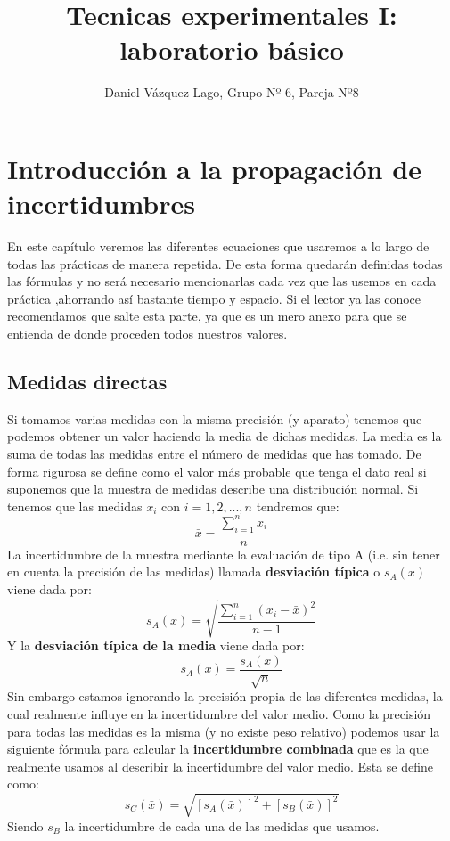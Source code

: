 \documentclass[12pt,a4paper]{book}
\author{Daniel Vázquez Lago, Grupo Nº 6, Pareja Nº8}
\begin{document}
\title{Tecnicas experimentales I: laboratorio básico}
\maketitle
\tableofcontents

\chapter{Introducción a la propagación de incertidumbres}\label{Ch:introduccion-incertidumbres}\newpage
En este capítulo veremos las diferentes ecuaciones que usaremos a lo  largo de todas las prácticas de manera repetida. De esta forma quedarán definidas todas las fórmulas y no será necesario mencionarlas cada vez que las usemos en cada práctica ,ahorrando así bastante tiempo y espacio. Si el lector ya las conoce recomendamos que salte esta parte, ya que es un mero anexo para que se entienda de donde proceden todos nuestros valores. \\

\section{Medidas directas}
Si tomamos varias medidas con la misma precisión (y aparato) tenemos que podemos obtener un valor haciendo la media de dichas medidas. La media es la suma de todas las medidas entre el número de medidas que has tomado. De forma rigurosa se define como el valor más probable que tenga el dato real si suponemos que la muestra de medidas describe una distribución normal. Si tenemos que las medidas $x_i$ con $i=1,2,...,n$ tendremos que:
\begin{equation}
\bar{x}=\dfrac{\sum_{i=1}^n x_i}{n}
\label{Ec: valor medio o media}
\end{equation}
La incertidumbre de la muestra mediante la evaluación de tipo A (i.e. sin tener en cuenta la precisión de las medidas) llamada \textbf{desviación típica} o $s_A (x)$ viene dada por:
\begin{equation}
s_A(x) = \sqrt{\dfrac{\sum_{i=1}^n (x_i - \bar{x})^2}{n-1}}
\label{Ec: desviación estandar de la muestra}
\end{equation}
Y la \textbf{desviación típica de la media} viene dada por:
\begin{equation}
s_A(\bar{x}) = \dfrac{s_A(x)}{\sqrt{n}}
\label{Ec: desviación estandar de la media}
\end{equation}
Sin embargo estamos ignorando la precisión propia de las diferentes medidas, la cual realmente influye en la incertidumbre del valor medio. Como la precisión para todas las medidas es la misma (y no existe peso relativo) podemos usar la siguiente fórmula para calcular la \textbf{incertidumbre combinada} que es la que realmente usamos al describir la incertidumbre del valor medio. Esta se define como:
\begin{equation}
s_C(\bar{x})=\sqrt{[s_A(\bar{x})]^2+[s_B (\bar{x})]^2}
\label{Ec: desviación combinada de la media}
\end{equation}
Siendo $s_B$ la incertidumbre de cada una de las medidas que usamos. 
\end{document}
